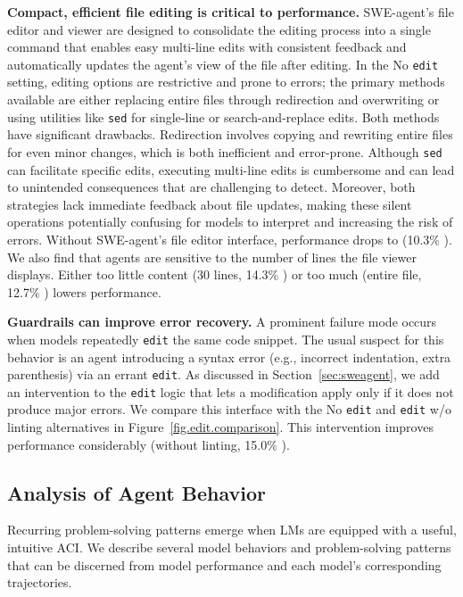 \textbf{Compact, efficient file editing is critical to performance.}
SWE-agent's file editor and viewer are designed to consolidate the editing process into a single command that enables easy multi-line edits with consistent feedback and automatically updates the agent's view of the file after editing.
In the No \texttt{edit} setting, editing options are restrictive and prone to errors; the primary methods available are either replacing entire files through redirection and overwriting or using utilities like \texttt{sed} for single-line or search-and-replace edits.
Both methods have significant drawbacks.
Redirection involves copying and rewriting entire files for even minor changes, which is both inefficient and error-prone.
Although \texttt{sed} can facilitate specific edits, executing multi-line edits is cumbersome and can lead to unintended consequences that are challenging to detect.
Moreover, both strategies lack immediate feedback about file updates, making these silent operations potentially confusing for models to interpret and increasing the risk of errors.
Without SWE-agent's file editor interface, performance drops to (\num{10.3}\% ).
We also find that agents are sensitive to the number of lines the file viewer displays.
Either too little content (30 lines, \num{14.3}\% ) or too much (entire file, \num{12.7}\% ) lowers performance.

\textbf{Guardrails can improve error recovery.}
A prominent failure mode occurs when models repeatedly \texttt{edit} the same code snippet.
The usual suspect for this behavior is an agent introducing a syntax error (e.g., incorrect indentation, extra parenthesis) via an errant \texttt{edit}.
As discussed in Section~\ref{sec:sweagent}, we add an intervention to the \texttt{edit} logic that lets a modification apply only if it does not produce major errors.
We compare this interface with the No \texttt{edit} and \texttt{edit} w/o linting alternatives  in Figure~\ref{fig.edit.comparison}.
This intervention improves performance considerably (without linting, \num{15.0}\% ).

\subsection{Analysis of Agent Behavior}
\label{sec:analysis:agent-behavior}
Recurring problem-solving patterns emerge when LMs are equipped with a useful, intuitive ACI.
We describe several model behaviors and problem-solving patterns that can be discerned from model performance and each model's corresponding trajectories.

